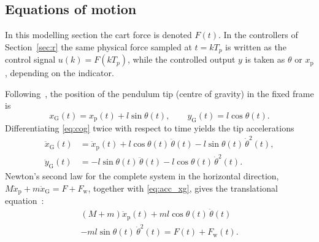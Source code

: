 \documentclass[twocolumn]{svjour3}
\begin{document}
\subsection{Equations of motion}
In this modelling section the cart force is denoted $F(t)$. In the controllers of
Section~\ref{sec:r} the same physical force sampled at $t=kT_p$ is written as the control
signal $u(k)=F(kT_p)$, while the controlled output $y$ is taken as $\theta$ or $x_\mathrm{p}$,
depending on the indicator.

Following~\cite{Prasad2014}, the position of the pendulum tip (centre of gravity) in the fixed frame is
\begin{equation}
x_\mathrm{G}(t) = x_\mathrm{p}(t) + l\sin\theta(t),\qquad
y_\mathrm{G}(t) = l\cos\theta(t).
\label{eq:cog}
\end{equation}
Differentiating \eqref{eq:cog} twice with respect to time yields the tip accelerations
\begin{align}
\ddot{x}_\mathrm{G}(t)
&= \ddot{x}_\mathrm{p}(t) + l\cos\theta(t)\,\ddot{\theta}(t)
 - l\sin\theta(t)\,\dot{\theta}^{2}(t),
\label{eq:acc_xg}\\
\ddot{y}_\mathrm{G}(t)
&= -l\sin\theta(t)\,\ddot{\theta}(t)
 - l\cos\theta(t)\,\dot{\theta}^{2}(t).
\label{eq:acc_yg}
\end{align}
Newton's second law for the complete system in the horizontal direction,
$M\ddot{x}_\mathrm{p}+m\ddot{x}_\mathrm{G}=F+F_\mathrm{w}$, together with \eqref{eq:acc_xg}, gives the translational equation~\cite{Prasad2014}:
\begin{multline}
(M{+}m)\ddot{x}_\mathrm{p}(t) + ml\cos\theta(t)\,\ddot{\theta}(t) \\
- ml\sin\theta(t)\,\dot{\theta}^{2}(t) = F(t) + F_\mathrm{w}(t).
\label{eq:trans}
\end{multline}
\end{document}
